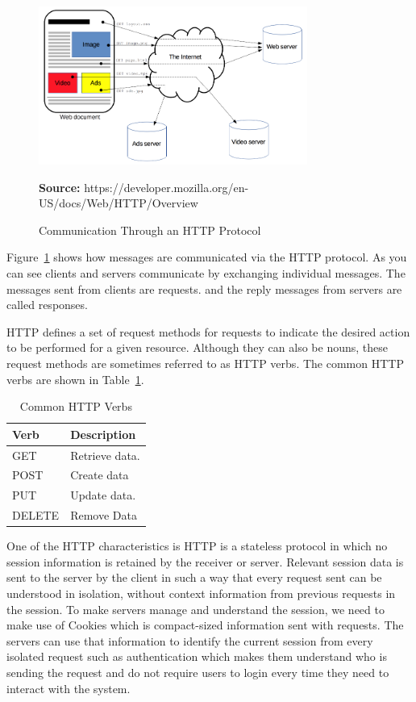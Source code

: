 \documentclass[12pt,oneside,openright,a4paper]{cpe-english-project}
\newcommand*{\captionsource}[2]{%
  \caption[{#1}]{#1}\vspace{-8pt}
  \textbf{Source:} #2}
\begin{document}
\begin{figure}[H]\centering
\includegraphics[width=250pt]{./images/2http.png}
\captionsource{Communication Through an HTTP Protocol}{https://developer.mozilla.org/en-US/docs/Web/HTTP/Overview}
\label{fig:2http}
\end{figure}\vspace{-24pt}
\vspace{1em}

Figure~\ref{fig:2http} shows how messages are communicated via the HTTP protocol. As you can see clients and servers communicate by exchanging individual messages. \cite{AnoverviewofHTTP} The messages sent from clients are requests. and the reply messages from servers are called responses.

HTTP defines a set of request methods for requests to indicate the desired action to be performed for a given resource. Although they can also be nouns, these request methods are sometimes referred to as HTTP verbs. \cite{HTTPrequestmethods} The common HTTP verbs are shown in Table~\ref{tbl:2CommonHTTPVerbs}.

\begin{table}[H]
\caption{Common HTTP Verbs}\label{tbl:2CommonHTTPVerbs}
\begin{tabularx}{\textwidth}{l|X} \hline\hline
Verb & Description \\ \hline\hline
GET & Retrieve data. \\ \hline
POST & Create data \\ \hline
PUT & Update data. \\ \hline
DELETE & Remove Data \\ \hline\hline
\end{tabularx}
\end{table}

One of the HTTP characteristics is HTTP is a stateless protocol in which no session information is retained by the receiver or server. Relevant session data is sent to the server by the client in such a way that every request sent can be understood in isolation, without context information from previous requests in the session.  \cite{Statelessprotocol} To make servers manage and understand the session, we need to make use of Cookies which is compact-sized information sent with requests. The servers can use that information to identify the current session from every isolated request such as authentication which makes them understand who is sending the request and do not require users to login every time they need to interact with the system.
\end{document}
